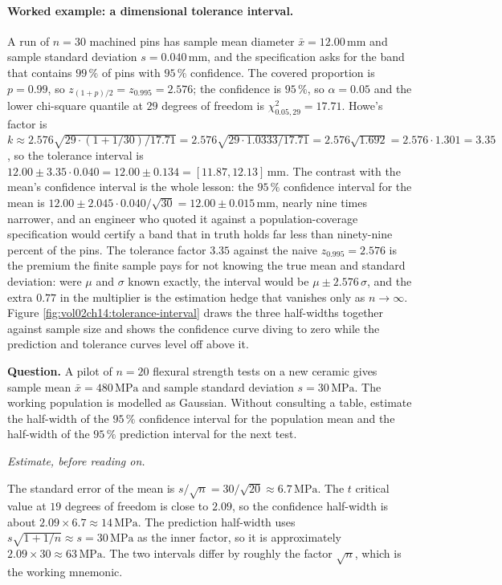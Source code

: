 \paragraph{Worked example: a dimensional tolerance interval.} A run of
$n = 30$ machined pins has sample mean diameter $\bar{x} =
12.00\,\si{\milli\meter}$ and sample standard deviation $s =
0.040\,\si{\milli\meter}$, and the specification asks for the band that
contains $99\,\%$ of pins with $95\,\%$ confidence. The covered
proportion is $p = 0.99$, so $z_{(1+p)/2} = z_{0.995} = 2.576$; the
confidence is $95\,\%$, so $\alpha = 0.05$ and the lower chi-square
quantile at $29$ degrees of freedom is $\chi^{2}_{0.05, 29} = 17.71$.
Howe's factor is $k \approx 2.576\sqrt{29 \cdot (1 + 1/30)/17.71} =
2.576\sqrt{29 \cdot 1.0333/17.71} = 2.576\sqrt{1.692} = 2.576 \cdot
1.301 = 3.35$, so the tolerance interval is $12.00 \pm 3.35 \cdot 0.040
= 12.00 \pm 0.134 = [11.87, 12.13]\,\si{\milli\meter}$. The contrast
with the mean's confidence interval is the whole lesson: the $95\,\%$
confidence interval for the mean is $12.00 \pm 2.045 \cdot 0.040/
\sqrt{30} = 12.00 \pm 0.015\,\si{\milli\meter}$, nearly nine times
narrower, and an engineer who quoted it against a population-coverage
specification would certify a band that in truth holds far less than
ninety-nine percent of the pins. The tolerance factor $3.35$ against
the naive $z_{0.995} = 2.576$ is the premium the finite sample pays for
not knowing the true mean and standard deviation: were $\mu$ and
$\sigma$ known exactly, the interval would be $\mu \pm 2.576\,\sigma$,
and the extra $0.77$ in the multiplier is the estimation hedge that
vanishes only as $n \to \infty$. Figure
\ref{fig:vol02ch14:tolerance-interval} draws the three half-widths
together against sample size and shows the confidence curve diving to
zero while the prediction and tolerance curves level off above it.



\begin{estimation}
\textbf{Question.} A pilot of $n = 20$ flexural strength tests on a
new ceramic gives sample mean $\bar{x} = 480 \,\si{\mega\pascal}$
and sample standard deviation $s = 30 \,\si{\mega\pascal}$. The
working population is modelled as Gaussian. Without consulting a
table, estimate the half-width of the $95\,\%$ confidence interval
for the population mean and the half-width of the $95\,\%$
prediction interval for the next test.

\smallskip
\textit{Estimate, before reading on.}

\smallskip
The standard error of the mean is $s/\sqrt{n} = 30/\sqrt{20}
\approx 6.7 \,\si{\mega\pascal}$. The $t$ critical value at $19$
degrees of freedom is close to $2.09$, so the confidence
half-width is about $2.09 \times 6.7 \approx 14 \,\si{\mega\pascal}$.
The prediction half-width uses $s\sqrt{1 + 1/n} \approx s = 30
\,\si{\mega\pascal}$ as the inner factor, so it is approximately
$2.09 \times 30 \approx 63 \,\si{\mega\pascal}$. The two intervals
differ by roughly the factor $\sqrt{n}$, which is the working
mnemonic.
\end{estimation}

